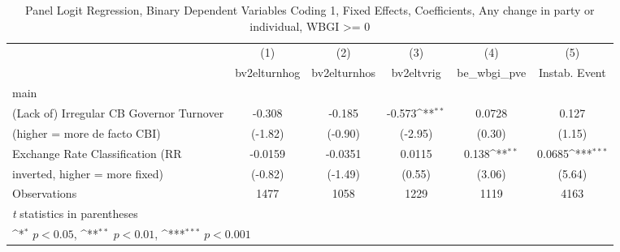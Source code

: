 \begin{table}[htbp]\centering
\def\sym#1{\ifmmode^{#1}\else\(^{#1}\)\fi}
\caption{Panel Logit Regression, Binary Dependent Variables Coding 1, Fixed Effects, Coefficients, Any change in party or individual, WBGI >= 0 \label{logitFEMultIndDF}}
\begin{tabular}{l*{5}{c}}
\toprule
                                        &\multicolumn{1}{c}{(1)}&\multicolumn{1}{c}{(2)}&\multicolumn{1}{c}{(3)}&\multicolumn{1}{c}{(4)}&\multicolumn{1}{c}{(5)}\\
                                        &\multicolumn{1}{c}{bv2elturnhog}&\multicolumn{1}{c}{bv2elturnhos}&\multicolumn{1}{c}{bv2eltvrig}&\multicolumn{1}{c}{be\_wbgi\_pve}&\multicolumn{1}{c}{Instab. Event}\\
\midrule
main                                    &                  &                  &                  &                  &                  \\
(Lack of) Irregular CB Governor Turnover&   -0.308         &   -0.185         &   -0.573\sym{**} &   0.0728         &    0.127         \\
(higher = more de facto CBI)            &  (-1.82)         &  (-0.90)         &  (-2.95)         &   (0.30)         &   (1.15)         \\
\addlinespace
Exchange Rate Classification (RR        &  -0.0159         &  -0.0351         &   0.0115         &    0.138\sym{**} &   0.0685\sym{***}\\
inverted, higher = more fixed)          &  (-0.82)         &  (-1.49)         &   (0.55)         &   (3.06)         &   (5.64)         \\
\midrule
Observations                            &     1477         &     1058         &     1229         &     1119         &     4163         \\
\bottomrule
\multicolumn{6}{l}{\footnotesize \textit{t} statistics in parentheses}\\
\multicolumn{6}{l}{\footnotesize \sym{*} \(p<0.05\), \sym{**} \(p<0.01\), \sym{***} \(p<0.001\)}\\
\end{tabular}
\end{table}
